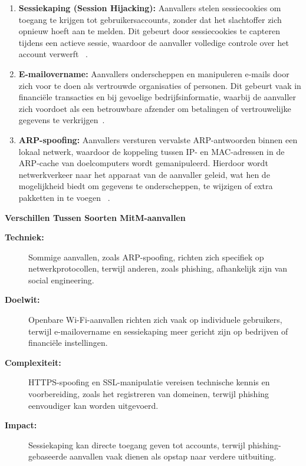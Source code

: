 \begin{enumerate}
  \item \textbf{Sessiekaping (Session Hijacking):}  
  Aanvallers stelen sessiecookies om toegang te krijgen tot gebruikersaccounts, zonder dat het slachtoffer zich opnieuw hoeft aan te melden. Dit gebeurt door sessiecookies te capteren tijdens een actieve sessie, waardoor de aanvaller volledige controle over het account verwerft ~\autocite{gangan2015}.
  
  \item \textbf{E-mailovername:}  
  Aanvallers onderscheppen en manipuleren e-mails door zich voor te doen als vertrouwde organisaties of personen. Dit gebeurt vaak in financiële transacties en bij gevoelige bedrijfsinformatie, waarbij de aanvaller zich voordoet als een betrouwbare afzender om betalingen of vertrouwelijke gegevens te verkrijgen~\autocite{Nmachi2023}.
  
  \item \textbf{ARP-spoofing:}  
  Aanvallers versturen vervalste ARP-antwoorden binnen een lokaal netwerk, waardoor de koppeling tussen IP- en MAC-adressen in de ARP-cache van doelcomputers wordt gemanipuleerd. Hierdoor wordt netwerkverkeer naar het apparaat van de aanvaller geleid, wat hen de mogelijkheid biedt om gegevens te onderscheppen, te wijzigen of extra pakketten in te voegen ~\autocite{arslan2017}.
\end{enumerate}



\textbf{Verschillen Tussen Soorten MitM-aanvallen}

\begin{description}
  \item[\textbf{Techniek:}]  
  Sommige aanvallen, zoals ARP-spoofing, richten zich specifiek op netwerkprotocollen, terwijl anderen, zoals phishing, afhankelijk zijn van social engineering.
  
  \item[\textbf{Doelwit:}]  
  Openbare Wi-Fi-aanvallen richten zich vaak op individuele gebruikers, terwijl e-mailovername en sessiekaping meer gericht zijn op bedrijven of financiële instellingen.
  
  \item[\textbf{Complexiteit:}]  
  HTTPS-spoofing en SSL-manipulatie vereisen technische kennis en voorbereiding, zoals het registreren van domeinen, terwijl phishing eenvoudiger kan worden uitgevoerd.
  
  \item[\textbf{Impact:}]  
  Sessiekaping kan directe toegang geven tot accounts, terwijl phishing-gebaseerde aanvallen vaak dienen als opstap naar verdere uitbuiting.
\end{description}

